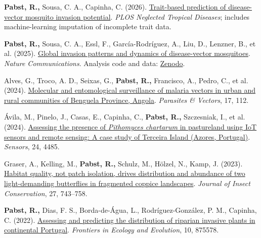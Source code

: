 \documentclass{simplecv}
\newcommand{\cvitemleft}[1]{%
  \noindent\makebox[1em][c]{\faAngleDoubleRight}%
  \parbox[t]{\dimexpr\linewidth-1em\relax}{#1}\par
  \smallskip
}
\begin{document}
\cvitemleft{\textbf{Pabst, R.,} Sousa, C. A., Capinha, C. (2026). \href{https://doi.org/10.1371/journal.pntd.0014538}{Trait-based prediction of disease-vector mosquito invasion potential}. \textit{PLOS Neglected Tropical Diseases}; includes machine-learning imputation of incomplete trait data.}

\cvitemleft{\textbf{Pabst, R.,} Sousa, C. A., Essl, F., García-Rodríguez, A., Liu, D., Lenzner, B., et al. (2025). \href{https://doi.org/10.1038/s41467-025-64446-3}{Global invasion patterns and dynamics of disease-vector mosquitoes}. \textit{Nature Communications}. Analysis code and data: \href{https://doi.org/10.5281/zenodo.15731142}{Zenodo}.}

\cvitemleft{Alves, G., Troco, A. D., Seixas, G., \textbf{Pabst, R.,} Francisco, A., Pedro, C., et al. (2024). \href{https://doi.org/10.1186/s13071-024-06214-8}{Molecular and entomological surveillance of malaria vectors in urban and rural communities of Benguela Province, Angola}. \textit{Parasites \& Vectors}, 17, 112.}

\cvitemleft{Ávila, M., Pinelo, J., Casas, E., Capinha, C., \textbf{Pabst, R.,} Szczesniak, I., et al. (2024). \href{https://doi.org/10.3390/s24144485}{Assessing the presence of \textit{Pithomyces chartarum} in pastureland using IoT sensors and remote sensing: A case study of Terceira Island (Azores, Portugal)}. \textit{Sensors}, 24, 4485.}

\cvitemleft{Graser, A., Kelling, M., \textbf{Pabst, R.,} Schulz, M., Hölzel, N., Kamp, J. (2023). \href{https://doi.org/10.1007/s10841-023-00494-8}{Habitat quality, not patch isolation, drives distribution and abundance of two light-demanding butterflies in fragmented coppice landscapes}. \textit{Journal of Insect Conservation}, 27, 743--758.}

\cvitemleft{\textbf{Pabst, R.,} Dias, F. S., Borda-de-Água, L., Rodríguez-González, P. M., Capinha, C. (2022). \href{https://doi.org/10.3389/fevo.2022.875578}{Assessing and predicting the distribution of riparian invasive plants in continental Portugal}. \textit{Frontiers in Ecology and Evolution}, 10, 875578.}
\end{document}
